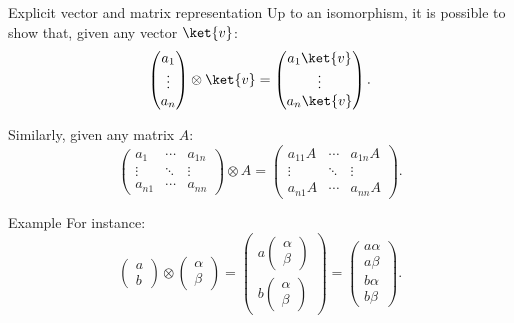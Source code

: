 \documentclass[a4paper]{article}
\begin{document}
\begin{parag}{Explicit vector and matrix representation}
    Up to an isomorphism, it is possible to show that, given any vector $\ket{v}$: 
    \[\begin{pmatrix} a_1 \\ \vdots \\ a_n \end{pmatrix} \otimes \ket{v} = \begin{pmatrix} a_1 \ket{v} \\ \vdots \\ a_n \ket{v} \end{pmatrix}.\]

    Similarly, given any matrix $A$:
    \[\begin{pmatrix} a_1 & \cdots & a_{1n} \\ \vdots & \ddots & \vdots \\ a_{n1} & \cdots & a_{nn} \end{pmatrix} \otimes A = \begin{pmatrix} a_{11} A & \cdots & a_{1n} A \\ \vdots & \ddots & \vdots \\ a_{n1} A & \cdots & a_{nn} A \end{pmatrix}.\]

    \begin{subparag}{Example}
        For instance:
        \[\begin{pmatrix} a \\ b \end{pmatrix} \otimes \begin{pmatrix} \alpha \\ \beta \end{pmatrix} = \begin{pmatrix} a \begin{pmatrix} \alpha \\ \beta \end{pmatrix}  \\ b \begin{pmatrix} \alpha \\ \beta \end{pmatrix} \end{pmatrix} = \begin{pmatrix} a \alpha \\ a \beta \\ b \alpha \\ b \beta \end{pmatrix}.\]
    \end{subparag}
\end{parag}
\end{document}

